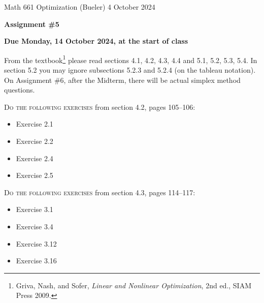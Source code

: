 \documentclass[12pt]{amsart}
\begin{document}
\scriptsize \noindent Math 661 Optimization (Bueler) \hfill 4 October 2024
\normalsize

\medskip\bigskip

\Large\centerline{\textbf{Assignment \#5}}
\large
\bigskip

\centerline{\textbf{Due Monday, 14 October 2024, at the start of class}}
\bigskip
\normalsize

\thispagestyle{empty}

\bigskip
\noindent From the textbook\footnote{Griva, Nash, and Sofer, \emph{Linear and Nonlinear Optimization}, 2nd ed., SIAM Press 2009.} please read sections 4.1, 4.2, 4.3, 4.4 and 5.1, 5.2, 5.3, 5.4.  In section 5.2 you may ignore subsections 5.2.3 and 5.2.4 (on the tableau notation).  On Assignment \#6, after the Midterm, there will be actual simplex method questions.

\bigskip
\noindent \textsc{Do the following exercises} from section 4.2, pages 105--106:

\begin{itemize}
\item Exercise 2.1
\item Exercise 2.2
\item Exercise 2.4
\item Exercise 2.5
\end{itemize}

\bigskip
\noindent \textsc{Do the following exercises} from section 4.3, pages 114--117:

\begin{itemize}
\item Exercise 3.1
\item Exercise 3.4
\item Exercise 3.12
\item Exercise 3.16
\end{itemize}
\end{document}

